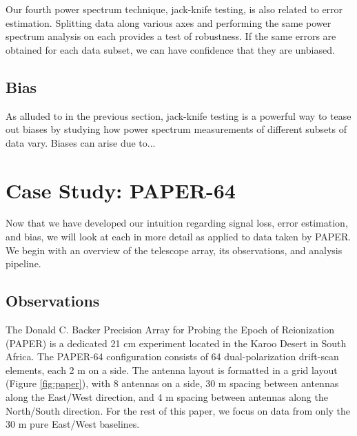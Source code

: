 \documentclass[preprint2,numberedappendix,tighten,twocolappendix]{aastex6}  %
\begin{document}
Our fourth power spectrum technique, jack-knife testing, is also related to error estimation. Splitting data along various axes and performing the same power spectrum analysis on each provides a test of robustness. If the same errors are obtained for each data subset, we can have confidence that they are unbiased.

\subsection{Bias}
\label{sec:BiasOverview}

As alluded to in the previous section, jack-knife testing is a powerful way to tease out biases by studying how power spectrum measurements of different subsets of data vary. Biases can arise due to... 

\section{Case Study: PAPER-64}
\label{sec:CaseStudy}

Now that we have developed our intuition regarding signal loss, error estimation, and bias, we will look at each in more detail as applied to data taken by PAPER. We begin with an overview of the telescope array, its observations, and analysis pipeline.

\subsection{Observations}
\label{sec:Obs}

The Donald C. Backer Precision Array for Probing the Epoch of Reionization (PAPER) is a dedicated 21 cm experiment located in the Karoo Desert in South Africa. The PAPER-64 configuration consists of 64 dual-polarization drift-scan elements, each 2 m on a side. The antenna layout is formatted in a grid layout (Figure \ref{fig:paper}), with 8 antennas on a side, 30 m spacing between antennas along the East/West direction, and 4 m spacing between antennas along the North/South direction. For the rest of this paper, we focus on data from only the 30 m pure East/West baselines. 
\end{document}
